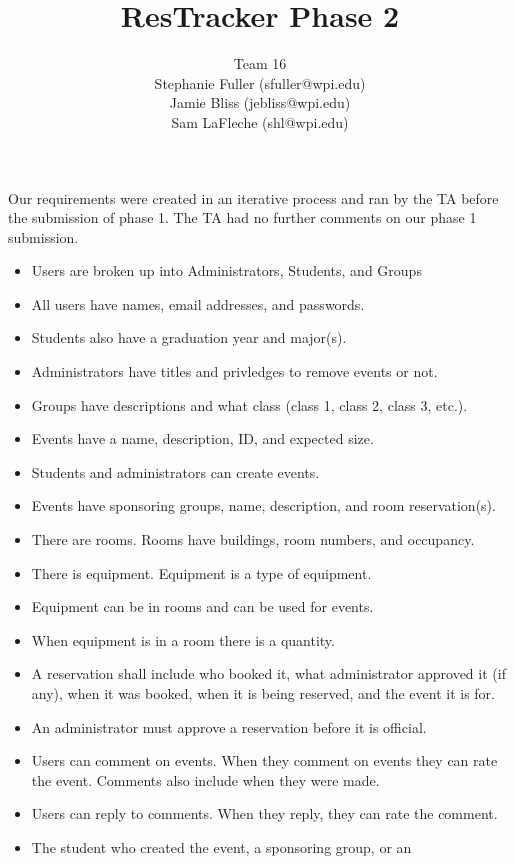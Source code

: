 \documentclass{article}
\title{ResTracker Phase 2}
\author{Team 16\\Stephanie Fuller (sfuller@wpi.edu)\\Jamie Bliss (jebliss@wpi.edu)\\Sam
LaFleche (shl@wpi.edu)}
\begin{document}
\maketitle


\section{}
Our requirements were created in an iterative process and ran by the TA before
the submission of phase 1. The TA had no further comments on our phase 1
submission. 

\begin{itemize}
\item Users are broken up into Administrators, Students, and Groups
\item All users have names, email addresses, and passwords.
\item Students also have a graduation year and major(s).
\item Administrators have titles and privledges to remove events or not. 
\item Groups have descriptions and what class (class 1, class 2, class 3, etc.).
\item Events have a name, description, ID, and expected size.
\item Students and administrators can create events.
\item Events have sponsoring groups, name, description, and room reservation(s).
\item There are rooms. Rooms have buildings, room numbers, and occupancy.
\item There is equipment. Equipment is a type of equipment.
\item Equipment can be in rooms and can be used for events.
\item When equipment is in a room there is a quantity.
\item A reservation shall include who booked it, what administrator
approved it (if any), when it was booked, when it is being reserved,
and the event it is for.
\item An administrator must approve a reservation before it is official.
\item Users can comment on events. When they comment on events they can rate the
event. Comments also include when they were made. 
\item Users can reply to comments. When they reply, they can rate the comment. 
\item The student who created the event, a sponsoring group, or an

\end{itemize}
\end{document}
